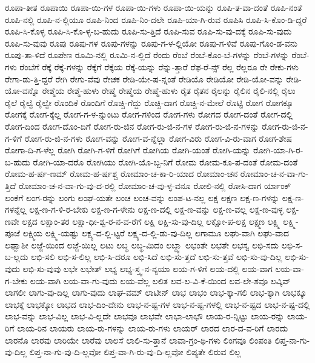 {ರೂಪಾ-ತೀತ
ರೂಪಾಯಿ
ರೂಪಾ-ಯಿ-ಗಳ
ರೂಪಾ-ಯಿ-ಗಳು
ರೂಪಾ-ಯಿ-ಯನ್ನು
ರೂಪಿ-ತ-ವಾ-ದಂತೆ
ರೂಪಿ-ನಂತೆ
ರೂಪಿ-ನಲ್ಲಿ
ರೂಪಿ-ನ-ಲ್ಲಿಯೂ
ರೂಪಿ-ನಿಂದ
ರೂಪಿ-ನಿಂ-ದಲೇ
ರೂಪಿ-ಯಾ-ಗಿ-ರುವ
ರೂಪಿಸಿ
ರೂಪಿ-ಸಿ-ಕೊಂ-ಡಿ-ದ್ದರೆ
ರೂಪಿ-ಸಿ-ಕೊಳ್ಳ
ರೂಪಿ-ಸಿ-ಕೊ-ಳ್ಳ-ಬ-ಹುದು
ರೂಪಿ-ಸು-ತ್ತಿದೆ
ರೂಪಿ-ಸುವ
ರೂಪಿ-ಸು-ವು-ದಕ್ಕೆ
ರೂಪಿ-ಸು-ವುದು
ರೂಪಿ-ಸು-ವುವು
ರೂಪು
ರೂಪು-ಗಳ
ರೂಪು-ಗಳನ್ನು
ರೂಪು-ಗ-ಳ-ಲ್ಲಿಯೋ
ರೂಪು-ಗ-ಳಿವೆ
ರೂಪು-ಗೊಂ-ಡ-ವನು
ರೂಪು-ತಾ-ಳಿದೆ
ರೂಪೇಣ
ರೂಮಿ-ನಲ್ಲಿ
ರೂಮಿ-ನ-ಲ್ಲಿದೆ
ರೆಂದು
ರೆಂಬೆ
ರೆಂಬೆ-ಕೊಂ-ಬೆ-ಗಳನ್ನು
ರೆಂಬೆ-ಗಳನ್ನು
ರೆಂಬೆ-ಗಳು
ರೆಂಬೆಗೆ
ರೆಕ್ಕೆ
ರೆಕ್ಕೆ-ಗಳನ್ನು
ರೆಕ್ಕೆಗೆ
ರೆಕ್ಕೆಯ
ರೆಕ್ಕೆ-ಯನ್ನು
ರೆನ್ನು-ತ್ತಾರೆ
ರೆಫ-ರೆ-ನ್ಸ್
ರೆಲ್ಲ
ರೆಲ್ಲರೂ
ರೇ
ರೇಕು-ಗಳು
ರೇಗಾ-ಡು-ತ್ತಿ-ದ್ದರೆ
ರೇಗಿ
ರೇಗು-ವೆವು
ರೇಚಕ
ರೇಡಿ-ಯೇ-ಷ-ನ್ನಂತೆ
ರೇಡಿಯೊ
ರೇಡಿಯೋ
ರೇಡಿ-ಯೋ-ವನ್ನು
ರೇಡಿ-ಯೋ-ವನ್ನೊ
ರೇಶ್ಮೆಯ
ರೇಶ್ಮೆ-ಹುಳು
ರೇಷ್ಮೆ
ರೇಷ್ಮೆಯ
ರೇಷ್ಮೆ-ಹುಳು
ರೈತ
ರೈತನ
ರೈಲನ್ನು
ರೈಲಿನ
ರೈಲಿ-ನಲ್ಲಿ
ರೈಲು
ರೈಲೆ
ರೈಲ್ವೆ
ರೈಲ್ವೇ
ರೊಂದಿಕೆ
ರೊಂದಿಗೆ
ರೊಚ್ಚಿ-ಗೆದ್ದು
ರೊಚ್ಚಿ-ದಾಗ
ರೊಚ್ಚಿ-ನ-ಮೇಲೆ
ರೊಟ್ಟಿ
ರೋಗ
ರೋಗಕ್ಕೂ
ರೋಗಕ್ಕೆ
ರೋಗ-ಕ್ಕೆಲ್ಲ
ರೋಗ-ಗ-ಳ-ನ್ನುಂಟು
ರೋಗ-ಗಳಿಂದ
ರೋಗ-ಗಳು
ರೋಗದ
ರೋಗ-ದಂತೆ
ರೋಗ-ದಲ್ಲಿ
ರೋಗ-ದಿಂದ
ರೋಗ-ದೊಂ-ದಿಗೆ
ರೋಗ-ರು-ಜಿನ
ರೋಗ-ರು-ಜಿ-ನ-ಗಳ
ರೋಗ-ರು-ಜಿ-ನ-ಗಳನ್ನು
ರೋಗ-ರು-ಜಿ-ನ-ಗ-ಳಿಗೆ
ರೋಗ-ರು-ಜಿ-ನ-ಗಳು
ರೋಗ-ವನ್ನು
ರೋಗ-ವ-ನ್ನೆಲ್ಲಾ
ರೋಗ-ವಿರು
ರೋಗ-ವಿ-ರು-ವಾಗ
ರೋಗ-ಶೇಷ
ರೋಗಾ-ದಿ-ಗ-ಳೆಲ್ಲ
ರೋಗಿ
ರೋಗಿ-ಗ-ಳಿಗೆ
ರೋಗಿಗೆ
ರೋಗಿಯ
ರೋಗಿ-ಯಂತೆ
ರೋಗಿ-ಯನ್ನು
ರೋಗಿ-ಯಾ-ಗಿ-ರ-ಬ-ಹುದು
ರೋಗಿ-ಯಾ-ದರೊ
ರೋಗಿಯು
ರೋಗಿ-ಯೊ-ಬ್ಬ-ನಿಗೆ
ರೋಮ
ರೋಮ-ಕೂ-ಪ-ದಂತೆ
ರೋಮ-ದಂತೆ
ರೋಮ-ಹ-ರ್ಷ-ಣಮ್
ರೋಮ-ಹ-ರ್ಷಶ್ಚ
ರೋಮಾಂ-ಚ-ಕಾ-ರಿ-ಯಾದ
ರೋಮಾಂ-ಚನ
ರೋಮಾಂ-ಚ-ನ-ವಾ-ಗು-ತ್ತಿದೆ
ರೋಮಾಂ-ಚ-ನ-ವಾ-ಗು-ವು-ದ-ರಲ್ಲಿ
ರೋಮಾಂ-ಚ-ವು-ಳ್ಳ-ವನೂ
ರೋಲಿ-ನಲ್ಲಿ
ರೋಸಿ-ದಾಗ
ರ್ಯಾಂಕ್
ಲಂಕೆಗೆ
ಲಂಗ-ರನ್ನು
ಲಂಗು
ಲಂಘ-ಯತೇ
ಲಂಚ
ಲಂಚ-ವನ್ನು
ಲಂಪ-ಟ-ನಲ್ಲ
ಲಕ್ಷ
ಲಕ್ಷಣ
ಲಕ್ಷ-ಣ-ಗಳನ್ನು
ಲಕ್ಷ-ಣ-ಗಳನ್ನೆಲ್ಲ
ಲಕ್ಷ-ಣ-ಗ-ಳಿ-ರ-ಬೇಕು
ಲಕ್ಷ-ಣ-ಗ-ಳೇನು
ಲಕ್ಷ-ಣ-ದಲ್ಲಿ
ಲಕ್ಷ-ಣ-ವನ್ನು
ಲಕ್ಷ-ಣ-ವಲ್ಲ
ಲಕ್ಷ-ಣ-ವುಳ್ಳ
ಲಕ್ಷ-ಣವೇ
ಲಕ್ಷದ
ಲಕ್ಷಾಂ-ತರ
ಲಕ್ಷಾ-ಧೀ-ಶ್ವ-ರ-ನ-ವ-ರೆಗೆ
ಲಕ್ಷಿ
ಲಕ್ಷಿ-ಸು-ವು-ದಿಲ್ಲ
ಲಕ್ಷೋ-ಪ-ಲಕ್ಷ
ಲಕ್ಷ್ಮಣ
ಲಕ್ಷ್ಮಿ
ಲಕ್ಷ್ಮಿ-ಪೂಜೆ
ಲಕ್ಷ್ಮಿಯ
ಲಕ್ಷ್ಮಿ-ಯಷ್ಟು
ಲಕ್ಷ್ಯ-ದ-ಲ್ಲಿ-ಟ್ಟರೆ
ಲಕ್ಷ್ಯ-ದ-ಲ್ಲಿ-ಡು-ವು-ದಿಲ್ಲ
ಲಗಾಮೂ
ಲಘು-ವಾಗಿ
ಲಘು-ವಾದ
ಲಘ್ವಾಶೀ
ಲಜ್ಜೆ-ಯಿಂದ
ಲಜ್ಜೆ-ಯಿಲ್ಲ
ಲಟು
ಲಬ್ಧ
ಲಬ್ಧ-ಮಿದಂ
ಲಬ್ಧ್ವಾ
ಲಭಂತೇ
ಲಭತೇ
ಲಭಸ್ವ
ಲಭಿ-ಸದು
ಲಭಿ-ಸ-ಬ-ಲ್ಲದು
ಲಭಿ-ಸಲಿ
ಲಭಿ-ಸ-ಲಿಲ್ಲ
ಲಭಿ-ಸಿ-ದರೂ
ಲಭಿ-ಸಿದೆ
ಲಭಿ-ಸು-ತ್ತದೆ
ಲಭಿ-ಸು-ತ್ತವೆ
ಲಭಿ-ಸು-ವು-ದಿಲ್ಲ
ಲಭಿ-ಸು-ವುದು
ಲಭಿ-ಸು-ವುವು
ಲಭೇ
ಲಭೇತ್
ಲಭ್ಯ
ಲಭ್ಯ-ಸ್ತ್ವ-ನ-ನ್ಯಯಾ
ಲಯ-ಗ-ಳಿಗೆ
ಲಯ-ದಲ್ಲಿ
ಲಯ-ವಾಗ
ಲಯ-ವಾ-ಗ-ಬೇಕು
ಲಯ-ವಾಗಿ
ಲಯ-ವಾ-ಗು-ವುದು
ಲಯ-ವೆಲ್ಲ
ಲಲಿತ
ಲವ-ಲ-ವಿ-ಕೆ-ಯಿಂದ
ಲವ-ಲೇ-ಶವೂ
ಲವ್ಕಿವ್
ಲಾಗಲೀ
ಲಾಗು-ವು-ದಿಲ್ಲ
ಲಾಗು-ವುದು
ಲಾಘ-ವಮ್
ಲಾಟೀನ್
ಲಾಭ
ಲಾಭಂ
ಲಾಭ-ಕ್ಕಾ-ಗಲಿ
ಲಾಭ-ಕ್ಕಾಗಿ
ಲಾಭಕ್ಕೂ
ಲಾಭಕ್ಕೆ
ಲಾಭಕ್ಕೋ
ಲಾಭದ
ಲಾಭ-ದಿಂ-ದೇನು
ಲಾಭ-ನ-ಷ್ಟ-ಗಳ
ಲಾಭ-ನ-ಷ್ಟ-ಗಳಲ್ಲಿ
ಲಾಭ-ನ-ಷ್ಟದ
ಲಾಭ-ನ-ಷ್ಟ-ದಲ್ಲಿ
ಲಾಭ-ವನ್ನು
ಲಾಭ-ವಿಲ್ಲ
ಲಾಭ-ವಿ-ಲ್ಲದೇ
ಲಾಭವೂ
ಲಾಭವೇ
ಲಾಭಾ-ಲಾಭೌ
ಲಾಯ-ರ-ನ್ನಿಟ್ಟು
ಲಾಯ-ರನ್ನು
ಲಾಯ-ರಿಗೆ
ಲಾಯ-ರಿನ
ಲಾಯರು
ಲಾಯ-ರು-ಗಳನ್ನು
ಲಾಯ-ರು-ಗಳು
ಲಾಯರ್
ಲಾರದ
ಲಾರ-ದ-ವ-ರಿಗೆ
ಲಾರದು
ಲಾರನೊ
ಲಾರವು
ಲಾರಿಯೇ
ಲಾರೆವು
ಲಾಲಸೆ
ಲಾಲಿ-ಸು-ತ್ತಾನೆ
ಲಾವಾ-ಗ್ರಂ-ಥಿ-ಗಳು
ಲಿಂಗವೂ
ಲಿಂಪಂತಿ
ಲಿಪ್ತ-ನಾ-ಗು-ವು-ದಿಲ್ಲ
ಲಿಪ್ತ-ನಾ-ಗು-ವು-ದಿ-ಲ್ಲವೋ
ಲಿಪ್ತ-ವಾ-ಗಿ-ರು-ವು-ದಿ-ಲ್ಲವೋ
ಲಿಪ್ಯತೇ
ಲಿರುವ
ಲಿಲ್ಲ
}
